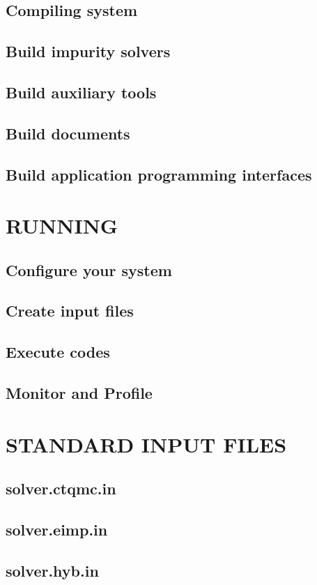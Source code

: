 \documentclass[10pt]{book}
\begin{document}
\section{Compiling system}
\section{Build impurity solvers}
\section{Build auxiliary tools}
\section{Build documents}
\section{Build application programming interfaces}

\chapter{RUNNING}
\section{Configure your system}
\section{Create input files}
\section{Execute codes}
\section{Monitor and Profile}

\chapter{STANDARD INPUT FILES}
\section{solver.ctqmc.in}
\section{solver.eimp.in}
\section{solver.hyb.in}
\end{document}
